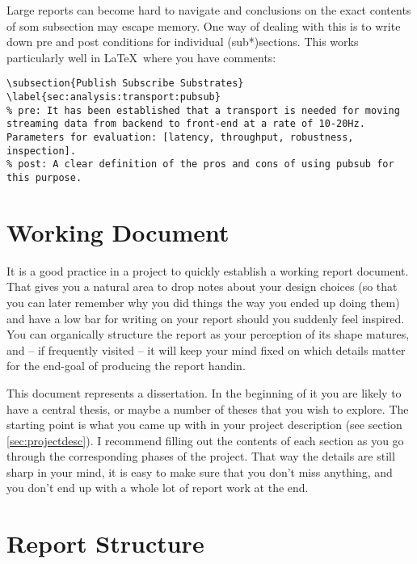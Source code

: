 \documentclass[a4paper, oneside]{memoir}
\begin{document}
Large reports can become hard to navigate and conclusions on the exact contents of som subsection may escape memory. One way of dealing with this is to write down pre and post conditions for individual (sub*)sections. This works particularly well in \LaTeX\ where you have comments:

\begin{verbatim}
\subsection{Publish Subscribe Substrates}
\label{sec:analysis:transport:pubsub}
% pre: It has been established that a transport is needed for moving streaming data from backend to front-end at a rate of 10-20Hz. Parameters for evaluation: [latency, throughput, robustness, inspection].
% post: A clear definition of the pros and cons of using pubsub for this purpose.
\end{verbatim}

\section{Working Document}

It is a good practice in a project to quickly establish a working report document. That gives you a natural area to drop notes about your design choices (so that you can later remember why you did things the way you ended up doing them) and have a low bar for writing on your report should you suddenly feel inspired. You can organically structure the report as your perception of its shape matures, and -- if frequently visited -- it will keep your mind fixed on which details matter for the end-goal of producing the report handin.

This document represents a dissertation. In the beginning of it you are likely to have a central thesis, or maybe a number of theses that you wish to explore. The starting point is what you came up with in your project description (see section \ref{sec:projectdesc}). I recommend filling out the contents of each section as you go through the corresponding phases of the project. That way the details are still sharp in your mind, it is easy to make sure that you don't miss anything, and you don't end up with a whole lot of report work at the end.

\section{Report Structure}
\end{document}
